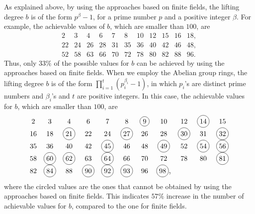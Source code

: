 \documentclass[journal,draftclsnofoot,onecolumn,12pt,twoside]{IEEEtran}
\newcommand\Circle[1]{%
  \tikz[baseline=(char.base)]\node[circle,draw,inner sep=2pt] (char) {#1};}
\begin{document}
As explained  above, by using the approaches based on finite fields, the lifting degree $b$ is of the form $p^{\beta}-1$, for a prime number $p$ and a positive integer $\beta$. For example, the achievable values of $b$, which are smaller than $100$, are
\begin{equation*}
\begin{array}{ccccccccccc}
     2 & 3 & 4 & 6 & 7 & 8 & 10 & 12 & 15 & 16 & 18, \\
     22 & 24 & 26 & 28 & 31 & 35 & 36 & 40 & 42 & 46 & 48, \\
     52 & 58 & 63 & 66 & 70 & 72 & 78 & 80 & 82 & 88 & 96.
   \end{array}
\end{equation*}
Thus, only $33\%$ of the possible values for $b$ can be achieved by using the approaches based on finite fields. When we employ the Abelian group rings,  the lifting degree $b$ is of the form $\prod_{i=1}^t \left(p_i^{\beta_i}-1\right)$, in which  $p_i$'s are distinct prime numbers and  $\beta_i$'s and $t$  are positive integers. In this case, the achievable values for $b$, which are smaller than $100$, are
\begin{equation*}
\begin{array}{ccccccccccc}
     2 & 3 & 4 & 6 & 7 & 8  & \Circle{$9$} & 10 & 12 & \Circle{$14$} & 15\\
     16 & 18 &\Circle{$21$} & 22 & 24 & \Circle{$27$} & 26 & 28 & \Circle{$30$}& 31 & \Circle{$32$}\\
     35 & 36 & 40 & 42 & \Circle{$45$} & 46 & 48 & \Circle{$49$}& 52 & \Circle{$54$} & \Circle{$56$}\\
     58 & \Circle{$60$} & \Circle{$62$} & 63 & \Circle{$64$} & 66 & 70 & 72 & 78 & 80 & \Circle{$81$}\\
     82 & \Circle{$84$} & 88 & \Circle{$90$}& \Circle{$92$} & \Circle{$93$} & 96  & \Circle{$98$}\mbox{\large ,} & & &
   \end{array}
\end{equation*}
where the circled values are the ones that cannot be obtained by using the approaches based on finite fields. This indicates $57\%$ increase in the number of achievable values for $b$, compared to the one for finite fields.
\end{document}
